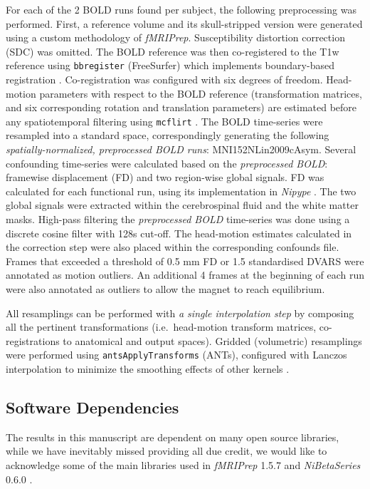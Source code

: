 \documentclass[10pt,letterpaper]{article}
\begin{document}
For each of the 2 BOLD runs found per subject,
the following preprocessing was performed.
First, a reference volume and its skull-stripped version were generated
using a custom methodology of \emph{fMRIPrep}.
Susceptibility distortion correction (SDC) was omitted.
The BOLD reference was then co-registered to the T1w reference using \texttt{bbregister}
(FreeSurfer) which implements boundary-based registration \cite{bbr}.
Co-registration was configured with six degrees of freedom.
Head-motion parameters with respect to the BOLD reference (transformation matrices,
and six corresponding rotation and translation parameters) are estimated before any
spatiotemporal filtering using \texttt{mcflirt} \cite[FSL 5.0.9,]{mcflirt}.
The BOLD time-series were resampled into a standard space, correspondingly
generating the following \emph{spatially-normalized, preprocessed BOLD runs}:
MNI152NLin2009cAsym.
Several confounding time-series were calculated based on the \emph{preprocessed BOLD}:
framewise displacement (FD) and two region-wise global signals.
FD was calculated for each functional run, using its
implementation in \emph{Nipype} \cite[following the definitions
by]{power_fd_dvars}.
The two global signals were extracted within the
cerebrospinal fluid and the white matter masks.
High-pass filtering the \emph{preprocessed BOLD} time-series was done using
a discrete cosine filter with 128s cut-off.
The head-motion estimates calculated in
the correction step were also placed within the corresponding confounds file. 
Frames that exceeded a threshold of 0.5 mm FD or 1.5 standardised DVARS
were annotated as motion outliers.
An additional 4 frames at the beginning of each run were also
annotated as outliers to allow the magnet to reach equilibrium.

All resamplings can be performed with \emph{a single interpolation step} by composing all the pertinent
transformations (i.e.~head-motion transform matrices, co-registrations to anatomical
and output spaces).
Gridded (volumetric) resamplings were performed using \texttt{antsApplyTransforms} (ANTs),
configured with Lanczos interpolation to minimize the smoothing effects of other kernels
\cite{lanczos}.

\subsection*{Software Dependencies}
\label{methods:software-dependencies}

The results in this manuscript are dependent on many open source
libraries, while we have inevitably missed providing all due credit,
we would like to acknowledge some of the main libraries used in 
\emph{fMRIPrep} 1.5.7 \cite{fmriprep1} and \emph{NiBetaSeries} 0.6.0 \cite{Kent2018}.
\end{document}
